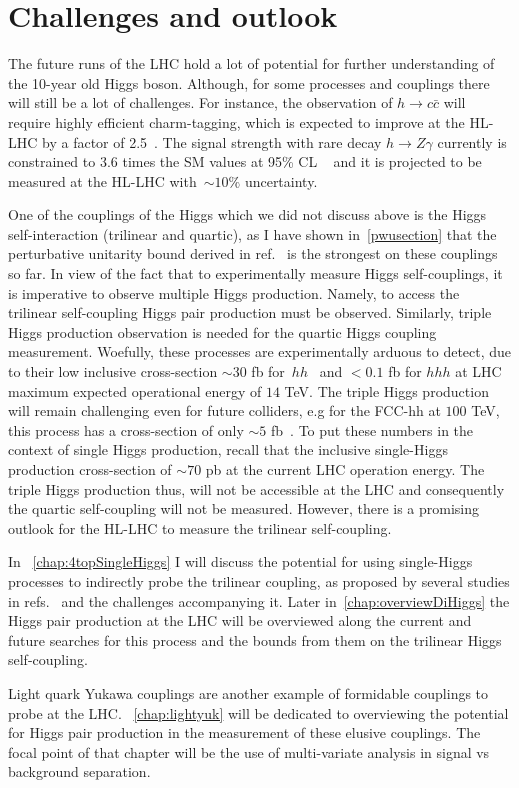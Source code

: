 \section{Challenges and outlook \label{sec:Higgscouplchallenge} }
\par The future runs of the LHC  hold a lot of potential for further understanding of the 10-year old Higgs boson.  Although, for some processes and couplings there will still be a lot of challenges. For instance, the observation of $h \to c \bar{c}$ will require highly efficient charm-tagging, which is expected to improve at the HL-LHC by a factor of 2.5~\cite{ATL-PHYS-PUB-2018-016}.  The signal strength with rare decay $ h \to Z \gamma$ currently is constrained to $3.6$ times the SM values at 95\% CL ~\cite{ATLAS:2020qcv} and it is projected to be measured at the HL-LHC with~$\sim 10\%$ uncertainty. 
\par One of the couplings of the Higgs which we did not discuss above is the Higgs self-interaction (trilinear and quartic), as I have shown in~\autoref{pwusection} that the perturbative unitarity bound derived in ref.~\cite{DiLuzio:2017tfn} is the strongest on these couplings so far.  In view of the fact that to experimentally measure Higgs self-couplings, it is imperative to observe multiple Higgs production. Namely, to access the trilinear self-coupling Higgs pair production must be observed. Similarly, triple Higgs production observation is needed for the quartic Higgs coupling measurement. Woefully, these processes are experimentally arduous to detect, due to their low inclusive cross-section $\sim 30$ fb for~$hh$~\cite{Dawson:1998py} and $<0.1$ fb for $hhh$ at LHC maximum expected operational energy of $14$ TeV. The triple Higgs production will remain  challenging even for future colliders, e.g for the FCC-hh at $100$ TeV, this process has a cross-section of only $\sim 5$ fb~\cite{Papaefstathiou:2015paa}.  To put these numbers in the context of single Higgs production, recall that the inclusive single-Higgs production cross-section of $\sim 70$ pb at the current LHC operation energy.  The triple Higgs production thus, will not be accessible at the LHC and consequently the quartic self-coupling will not be measured. However, there is a promising outlook for the HL-LHC to measure the trilinear self-coupling.
\par In ~\autoref{chap:4topSingleHiggs} I will discuss the potential for using single-Higgs processes to indirectly probe the trilinear coupling, as proposed by several studies in refs.~ \cite{McCullough:2013rea, Gorbahn:2016uoy, Degrassi:2016wml, Bizon:2016wgr, Maltoni:2017ims, Degrassi:2019yix, Degrassi:2021uik, Haisch:2021hvy} and the challenges accompanying it. Later in~\autoref{chap:overviewDiHiggs} the Higgs pair production at the LHC will be overviewed along the current and future searches for this process and the bounds from them on the trilinear Higgs self-coupling. 
\par Light quark Yukawa couplings are another example of formidable couplings to probe at the LHC. ~\autoref{chap:lightyuk} will be dedicated to overviewing the potential for Higgs pair production in the measurement of these elusive couplings. The focal point of that chapter will be the use of multi-variate analysis in  signal vs background separation.
